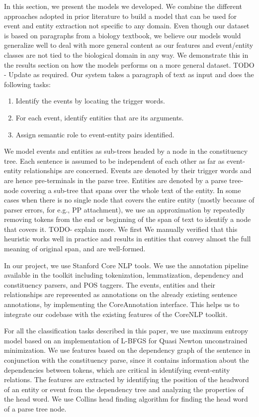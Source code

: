 In this section, we present the models we developed. We combine the different approaches adopted in prior literature to build a model that can be used for event and entity extraction not specific to any domain. Even though our dataset is based on paragraphs from a biology textbook, we believe our models would generalize well to deal with more general content as our features and event/entity classes are not tied to the biological domain in any way. We demonstrate this in the results section on how the models performs on a more general dataset. TODO - Update as required. Our system takes a paragraph of text as input and does the following tasks:

\begin{enumerate}
\item Identify the events by locating the trigger words.
\item For each event, identify entities that are its arguments.
\item Assign semantic role to event-entity pairs identified.
\end{enumerate}

We model events and entities as sub-trees headed by a node in the constituency tree. Each sentence is assumed to be independent of each other as far as event-entity relationships are concerned. Events are denoted by their trigger words and are hence pre-terminals in the parse tree. Entities are denoted by a parse tree-node covering a sub-tree that spans over the whole text of the entity. In some cases when there is no single node that covers the entire entity (mostly because of parser errors, for e.g., PP attachment), we use an approximation by repeatedly removing tokens from the end or beginning of the span of text to identify a node that covers it. TODO- explain more. We first We manually verified that this heuristic works well in practice and results in entities that convey almost the full meaning of original span, and are well-formed.

In our project, we use Stanford Core NLP tools. We use the annotation pipeline available in the toolkit including tokenization, lemmatization, dependency and constituency parsers, and POS taggers. The events, entities and their relationships are represented as annotations on the already existing sentence annotations, by implementing the CoreAnnotation interface. This helps us to integrate our codebase with the existing features of the CoreNLP toolkit.

For all the classification tasks described in this paper, we use maximum entropy model based on an implementation of L-BFGS for Quasi Newton unconstrained minimization. We use features based on the dependency graph of the sentence in conjunction with the constituency parse, since it contains information about the dependencies between tokens, which are critical in identifying event-entity relations. The features are extracted by identifying the position of the headword of an entity or event from the dependency tree and analyzing the properties of the head word. We use Collins head finding algorithm for finding the head word of a parse tree node. 

